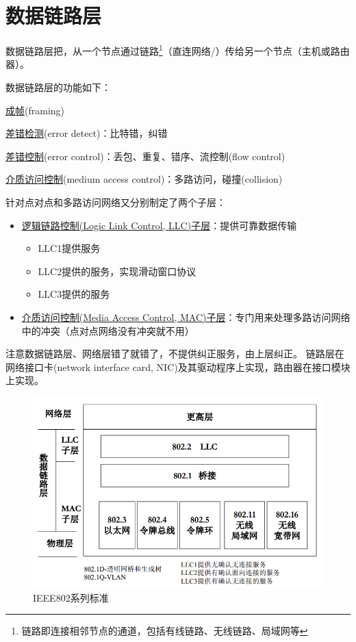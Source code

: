 
\section{数据链路层}
数据链路层把，从一个节点通过链路\footnote{链路即连接相邻节点的通道，包括有线链路、无线链路、局域网等}（直连网络/）传给另一个节点（主机或路由器）。

\bigskip
数据链路层的功能如下：
\begin{partlist}
	\item \underline{成帧}(framing)
	\item \underline{差错检测}(error detect)：比特错，纠错
	\item \underline{差错控制}(error control)：丢包、重复、错序、流控制(flow control)
	\item \underline{介质访问控制}(medium access control)：多路访问，碰撞(collision)
\end{partlist}

\bigskip
针对点对点和多路访问网络又分别制定了两个子层：
\begin{itemize}
	\item \underline{逻辑链路控制(Logic Link Control, LLC)子层}：提供可靠数据传输
	\begin{itemize}
		\item LLC1提供服务
		\item LLC2提供的服务，实现滑动窗口协议
		\item LLC3提供的服务
	\end{itemize}
	\item \underline{介质访问控制(Media Access Control, MAC)子层}：专门用来处理多路访问网络中的冲突（点对点网络没有冲突就不用）
\end{itemize}

注意数据链路层、网络层错了就错了，不提供纠正服务，由上层纠正。
链路层在网络接口卡(network interface card, NIC)及其驱动程序上实现，路由器在接口模块上实现。

\begin{figure}[H]
	\centering
	\includegraphics[width=0.65\linewidth]{fig/ieee802.PNG}
	\caption*{IEEE802系列标准}
\end{figure}

